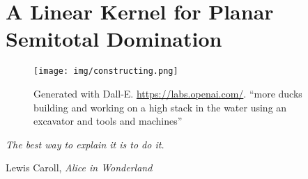 \chapter{A Linear Kernel for Planar Semitotal Domination}\label{ch:linkern}

\vspace*{-50pt}
\begin{figure}[ht]
\texttt{[image: img/constructing.png]}
        \captionsetup{textformat=empty,labelformat=blank}
        \caption{Generated with Dall-E. \url{https://labs.openai.com/}. ``more ducks building and working on  a high stack in the water using an excavator and tools and machines''}
\end{figure}

\epigraph{\itshape The best way to explain it is to do it.}{Lewis Caroll, \textit{Alice in Wonderland}}

